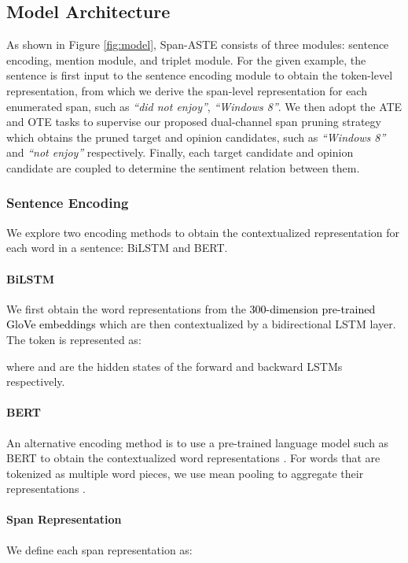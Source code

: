 \documentclass[11pt,a4paper]{article}
\newcommand{\cmt}[1]{\ignorespaces}
\begin{document}
\subsection{Model Architecture}
As shown in Figure \ref{fig:model}, 
Span-ASTE consists of three modules: sentence encoding, mention module, and triplet module. 
For the given example, the sentence is first input to the sentence encoding module to obtain the token-level representation, from which we derive the span-level representation for each enumerated span, such as \textit{``did not enjoy''}, \textit{``Windows 8''}. 
We then adopt the ATE and OTE tasks to supervise our proposed dual-channel span pruning strategy which obtains the pruned target and opinion candidates, such as \textit{``Windows 8''} and \textit{``not enjoy''} respectively.
Finally, each target candidate and opinion candidate are coupled to determine the sentiment relation between them.





\subsubsection{Sentence Encoding}
We explore two encoding methods to obtain the contextualized representation for each word in a sentence: BiLSTM and BERT.
\paragraph{BiLSTM}
We 
first obtain the word representations  from the 
\textcolor{black}{300-dimension pre-trained GloVe \cite{pennington2014glove} \cmt{word} embeddings}
which are then contextualized by a bidirectional LSTM \cite{lstm97} layer.
The  token is represented as:

where  and  are the hidden states of the forward and backward LSTMs respectively. 

\paragraph{BERT} 
An alternative encoding method 
is to use a pre-trained language model such as BERT \cite{devlin2019bert} to obtain the contextualized word representations
.
For words that are tokenized as multiple word pieces, we use mean pooling to aggregate their representations \cmt{across word pieces}.

\paragraph{Span Representation}
\label{representation}
We define each span representation  as:
\end{document}
